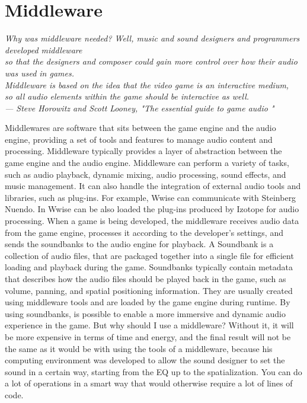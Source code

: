 \section{Middleware}
\begin{flushright}
	\itshape
	Why was middleware needed? Well, music and sound designers and programmers developed middleware \\
	so that the designers and composer could gain more control over how their audio was used in games.\\
	Middleware is based on the idea that the video game is an interactive medium, \\
	so all audio elements within the game should be interactive as well. \\
	\medskip
	--- Steve Horowitz and Scott Looney, "The essential guide to game audio "
\end{flushright}

Middlewares are software that sits between the game engine and the audio engine, providing a set of tools and features to manage audio content and processing. Middleware typically provides a layer of abstraction between the game engine and the audio engine.
Middleware can perform a variety of tasks, such as audio playback, dynamic mixing, audio processing, sound effects, and music management. It can also handle the integration of external audio tools and libraries, such as plug-ins. For example, Wwise can communicate with Steinberg Nuendo. In Wwise can be also loaded the plug-ins produced by Izotope for audio processing.
When a game is being developed, the middleware receives audio data from the game engine, processes it according to the developer's settings, and sends the soundbanks to the audio engine for playback.
A Soundbank is a collection of audio files, that are packaged together into a single file for efficient loading and playback during the game.
Soundbanks typically contain metadata that describes how the audio files should be played back in the game, such as volume, panning, and spatial positioning information. They are usually created using middleware tools and are loaded by the game engine during runtime. By using soundbanks, is possible to enable a more immersive and dynamic audio experience in the game.
But why should I use a middleware? Without it, it will be more expensive in terms of time and energy, and the final result will not be the same as it would be with using the tools of a middleware, because his computing environment was developed to allow the sound designer to set the sound in a certain way, starting from the EQ up to the spatialization. You can do a lot of operations in a smart way that would otherwise require a lot of lines of code.

